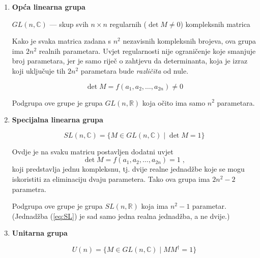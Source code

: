 \begin{enumerate}
\item \textbf{Opća linearna grupa}

$GL(n, \mathbb{C})$ --- skup svih $n\times n$ regularnih ($\det M \neq 0$)
kompleksnih matrica

Kako je svaka matrica zadana s $n^2$ nezavisnih kompleksnih brojeva, ova
grupa ima $2 n^2$ realnih parametara. Uvjet regularnosti nije ograničenje
koje smanjuje broj parametara, jer je samo riječ o zahtjevu da determinanta,
koja je izraz koji uključuje tih $2 n^2$ parametara bude \emph{različita} od nule.

\begin{equation}
\det M = f(a_1, a_2 , \dots, a_{2n}) \neq 0
\end{equation}

Podgrupa ove grupe je grupa $GL(n, \mathbb{R})$ koja očito ima samo
$n^2$ parametara.

\item \textbf{Specijalna linearna grupa}

\begin{equation}
SL(n, \mathbb{C}) = \{ M\in GL(n,\mathbb{C}) \; | \; \det M = 1\}
\end{equation}

Ovdje je na svaku matricu postavljen dodatni uvjet
\begin{equation}
\det M = f(a_1, a_2 , \dots, a_{2n}) = 1 \;,
\label{eq:SL}
\end{equation}
koji predstavlja jednu kompleksnu, tj. dvije realne jednadžbe koje
se mogu iskoristiti za eliminaciju dvaju parametera. Tako ova grupa
ima $2 n^2 - 2$ parametra.

Podgrupa ove grupe je grupa $SL(n, \mathbb{R})$ koja ima 
$n^2 - 1$ parametar. (Jednadžba (\ref{eq:SL}) je sad samo jedna
realna jednadžba, a ne dvije.)

\item \textbf{Unitarna grupa}

\begin{equation}
U(n) = \{ M\in GL(n,\mathbb{C}) \; | \; M M^{\dagger} = 1\}
\end{equation}


\end{enumerate}
